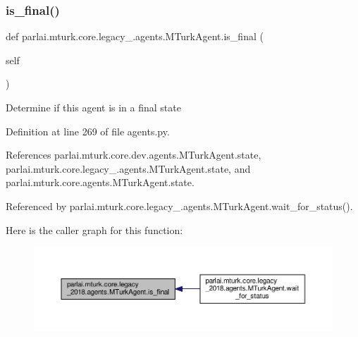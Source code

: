 \subsubsection{\texorpdfstring{is\+\_\+final()}{is\_final()}}
{\footnotesize\ttfamily def parlai.\+mturk.\+core.\+legacy\+\_.\+agents.\+M\+Turk\+Agent.\+is\+\_\+final (\begin{DoxyParamCaption}\item[{}]{self }\end{DoxyParamCaption})}

\begin{DoxyVerb}Determine if this agent is in a final state\end{DoxyVerb}
 

Definition at line 269 of file agents.\+py.



References parlai.\+mturk.\+core.\+dev.\+agents.\+M\+Turk\+Agent.\+state, parlai.\+mturk.\+core.\+legacy\+\_.\+agents.\+M\+Turk\+Agent.\+state, and parlai.\+mturk.\+core.\+agents.\+M\+Turk\+Agent.\+state.



Referenced by parlai.\+mturk.\+core.\+legacy\+\_.\+agents.\+M\+Turk\+Agent.\+wait\+\_\+for\+\_\+status().

Here is the caller graph for this function\+:
\nopagebreak
\begin{figure}[H]
\begin{center}
\leavevmode
\includegraphics[width=350pt]{classparlai_1_1mturk_1_1core_1_1legacy__2018_1_1agents_1_1MTurkAgent_a45ac31e91fb1d40d2a4907e56e13cce6_icgraph}
\end{center}
\end{figure}
\mbox{\label{classparlai_1_1mturk_1_1core_1_1legacy__2018_1_1agents_1_1MTurkAgent_a575ea7912571bb6e565f9e12b2c19ea6}} 
